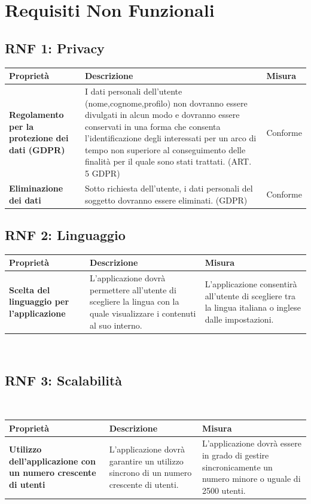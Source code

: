 \documentclass{article}
\begin{document}
\section{Requisiti Non Funzionali}

\subsection{RNF 1: Privacy}
\begin{tabular}{|p{4cm}|p{6cm}|p{4cm}|}
\hline
\textbf{Proprietà} & \textbf{Descrizione} & \textbf{Misura} \\
\hline
\textbf{Regolamento per la protezione dei dati (GDPR)} & I dati personali dell’utente (nome,cognome,profilo) non dovranno essere divulgati in alcun modo e dovranno essere conservati in una forma che consenta l’identificazione degli interessati per un arco di tempo non superiore al conseguimento delle finalità per il quale sono stati trattati. (ART. 5 GDPR) & Conforme \\
\hline
\textbf{Eliminazione dei dati} & Sotto richiesta dell’utente, i dati personali del soggetto dovranno essere eliminati. (GDPR) & Conforme \\
\hline
\end{tabular}



\subsection{RNF 2: Linguaggio}

\begin{tabular}{|p{4cm}|p{6cm}|p{4cm}|}
\hline
\textbf{Proprietà} & \textbf{Descrizione} & \textbf{Misura} \\
\hline
\textbf{Scelta del linguaggio per l’applicazione} & L’applicazione dovrà permettere all’utente di scegliere la lingua con la quale visualizzare i contenuti al suo interno. & L’applicazione consentirà all’utente di scegliere tra la lingua italiana o inglese dalle impostazioni. \\
\hline
\end{tabular}\\

\subsection{RNF 3: Scalabilità}\\

\begin{tabular}{|p{4cm}|p{6cm}|p{4cm}|}
\hline
\textbf{Proprietà} & \textbf{Descrizione} & \textbf{Misura} \\
\hline
\textbf{Utilizzo dell’applicazione con un numero crescente di utenti} & L’applicazione dovrà garantire un utilizzo sincrono di un numero crescente di utenti. & L’applicazione dovrà essere in grado di gestire sincronicamente un numero minore o uguale di 2500 utenti. \\
\hline
\end{tabular}\\\\
\end{document}
